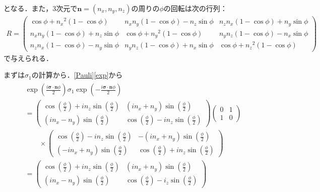 \documentclass[a4paper]{ltjsreport}
\begin{document}
となる．また，3次元で$\boldsymbol{n}=(n_x,n_y,n_z)$の周りの$\phi$の回転は次の行列：
\begin{align}
  R=\left(
  \begin{array}{ccc}
    \cos\phi+n_x{}^2(1-\cos\phi) & n_x n_y(1-\cos\phi)-n_z\sin\phi & n_z n_x(1-\cos\phi)+n_y\sin\phi \\
    n_x n_y(1-\cos\phi)+n_z\sin\phi &  \cos\phi+n_y{}^2(1-\cos\phi) & n_y n_z(1-\cos\phi)-n_x\sin\phi \\
    n_z n_x(1-\cos\phi)-n_y\sin\phi &  n_y n_z(1-\cos\phi)+n_x\sin\phi & \cos\phi+n_z{}^2(1-\cos\phi)
  \end{array}
  \right)
  \label{Rodriguez}
\end{align}
で与えられる．

まずは$\sigma_1$の計算から．\eqref{Pauli}\eqref{exp}から
\begin{align}
  \begin{split}
    & \exp\left(\frac{i\boldsymbol{\sigma}\cdot\boldsymbol{n}\phi}{2}\right)\sigma_1\exp\left(-\frac{i\boldsymbol{\sigma}\cdot\boldsymbol{n}\phi}{2}\right)\\
    & =
    \begin{pmatrix}
      \cos\left(\frac{\phi}{2}\right)+in_z\sin\left(\frac{\phi}{2}\right) & (in_x+n_y)\sin\left(\frac{\phi}{2}\right) \\
      (in_x-n_y)\sin\left(\frac{\phi}{2}\right) & \cos\left(\frac{\phi}{2}\right)-in_z\sin\left(\frac{\phi}{2}\right)
    \end{pmatrix}
    \begin{pmatrix}
      0 & 1 \\
      1 & 0
    \end{pmatrix}
    \\
    & \qquad\times
    \begin{pmatrix}
      \cos\left(\frac{\phi}{2}\right)-in_z\sin\left(\frac{\phi}{2}\right) & -(in_x+n_y)\sin\left(\frac{\phi}{2}\right) \\
      (-in_x+n_y)\sin\left(\frac{\phi}{2}\right) & \cos\left(\frac{\phi}{2}\right)+in_z\sin\left(\frac{\phi}{2}\right)
    \end{pmatrix}
    \\
    & =
    \begin{pmatrix}
      \cos\left(\frac{\phi}{2}\right)+in_z\sin\left(\frac{\phi}{2}\right) & (in_x+n_y)\sin\left(\frac{\phi}{2}\right)\\
      (in_x-n_y)\sin\left(\frac{\phi}{2}\right) & \cos\left(\frac{\phi}{2}\right)-i_z\sin\left(\frac{\phi}{2}\right)

\end{pmatrix}
\end{split}
\end{align}
\end{document}
